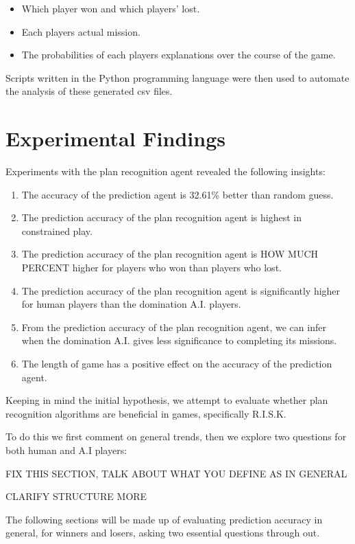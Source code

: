 \documentclass[parskip]{cs4rep}
\begin{document}
\begin{itemize}
\item
Which player won and which players' lost.
\item
Each players actual mission.
\item
The probabilities of each players explanations over the course of the game.
\end{itemize}

Scripts written in the Python programming language were then used to automate the analysis of these generated csv files.

\newpage

\section{Experimental Findings}

Experiments with the plan recognition agent revealed the following insights:

\begin{enumerate}
\item
The accuracy of the prediction agent is 32.61\% better than random guess.
\item
The prediction accuracy of the plan recognition agent is highest in constrained play. 
\item
The prediction accuracy of the plan recognition agent is HOW MUCH PERCENT higher for players who won than players who lost.
\item
The prediction accuracy of the plan recognition agent is significantly higher for human players than the domination A.I. players.
\item
From the prediction accuracy of the plan recognition agent, we can infer when the domination A.I. gives less significance to completing its missions.
\item
The length of game has a positive effect on the accuracy of the prediction agent.
\end{enumerate}

Keeping in mind the initial hypothesis, we attempt to evaluate whether plan recognition algorithms are beneficial in games, specifically R.I.S.K.

To do this we first comment on general trends, then we explore two questions for both human and A.I players:

FIX THIS SECTION, TALK ABOUT WHAT YOU DEFINE AS IN GENERAL

CLARIFY STRUCTURE MORE

The following sections will be made up of evaluating prediction accuracy in general, for winners and losers, asking two essential questions through out.
\end{document}
